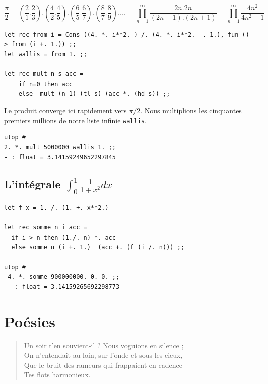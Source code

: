 \[ \frac{\pi}{2} = ( \frac{2}{1}.\frac{2}{3} ) . (\frac{4}{2}.\frac{4}{5} ).(\frac{6}{5}.\frac{6}{7} ).(\frac{8}{7}.\frac{8}{9} ) . ...  =  \prod_{n=1}^\infty \frac{2n.2n}{(2n-1).(2n+1)} = \prod_{n=1}^\infty \frac{4n^2}{4n^2-1}\]
\vspace{0.3cm}	
\begin{Verbatim}
let rec from i = Cons ((4. *. i**2. ) /. (4. *. i**2. -. 1.), fun () -> from (i +. 1.)) ;;
let wallis = from 1. ;;

let rec mult n s acc =
	if n=0 then acc
	else  mult (n-1) (tl s) (acc *. (hd s)) ;;
\end{Verbatim}
Le produit converge ici rapidement vers $\pi /2$. Nous multiplions les cinquantes premiers millions 
de notre liste infinie \verb+wallis+.
\begin{Verbatim}
utop # 
2. *. mult 5000000 wallis 1. ;;
- : float = 3.14159249652297845
\end{Verbatim}

\subsection{L'intégrale $\int_0^1 \frac{1}{1+x^2} dx$}
 
\begin{Verbatim}
let f x = 1. /. (1. +. x**2.)

let rec somme n i acc =
  if i > n then (1./. n) *. acc 
  else somme n (i +. 1.)  (acc +. (f (i /. n))) ;;

utop # 
 4. *. somme 900000000. 0. 0. ;;
 - : float = 3.14159265692298773
\end{Verbatim}

\section{Poésies}
\begin{verse}
	Un soir t'en souvient-il ? Nous voguions en silence ; \\
	On n’entendait au loin, sur l’onde et sous les cieux,  \\
	Que le bruit des rameurs qui frappaient en cadence     \\
	Tes flots harmonieux. \\
\end{verse}

